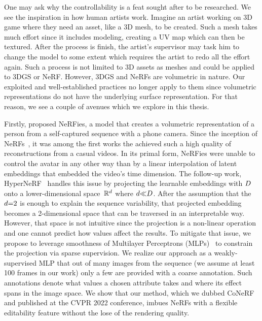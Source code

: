   One may ask why the controllability is a feat sought after to be researched.
  We see the inspiration in how human artists work.
  Imagine an artist working on 3D game where they need an asset, like a 3D mesh,
  to be created.
  Such a mesh takes much effort since it includes modeling, creating a UV map
  which can then be textured.
  After the process is finish, the artist's supervisor may task him to change
  the model to some extent which requires the artist to redo all the effort
  again.
  Such a process is not limited to 3D assets as meshes and could be applied to
  3DGS or NeRF.
  However, 3DGS and NeRFs are volumetric in nature.
  Our exploited and well-established practices no longer apply to them since
  volumetric representations do not have the underlying surface representation.
  For that reason, we see a couple of avenues which we explore in this thesis.

  Firstly, \textcite{park2021nerfies} proposed NeRFies, a model that creates a
  volumetric representation of a person from a self-captured sequence with a
  phone camera.
  Since the inception of NeRFs~\cite{mildenhall2020nerf}, it was among the first
  works the achieved such a high quality of reconstructions from a casual
  videos.
  In its primal form, NeRFies were unable to control the avatar in any other way
  than by a linear interpolation of latent embeddings that embedded the video's
  time dimension.
  The follow-up work, HyperNeRF~\cite{park2021hypernerf} handles this issue by
  projecting the learnable embeddings with $D$ onto a
  lower-dimensional space~$\mathbb{R}^d$ where $d
    {\ll}D$.
  After the assumption that the $d{=}2$ is enough to explain
  the sequence variability, that projected embedding becomes a 2-dimensional
  space that can be traversed in an interpretable way.
  However, that space is not intuitive since the projection is a non-linear
  operation and one cannot predict how values affect the results.
  To mitigate that issue, we propose to leverage smoothness of Multilayer
  Perceptrons (MLPs)~\cite{tancik2020fourier,park2021nerfies} to constrain the
  projection via sparse supervision.
  We realize our approach as a weakly-supervised MLP that out of many images
  from the sequence (we assume at least 100 frames in our work) only a few are
  provided with a coarse annotation.
  Such annotations denote what values a chosen attribute takes and where its
  effect spans in the image space.
  We show that our method, which we dubbed CoNeRF~\cite{kania2022conerf} and
  published at the CVPR 2022 conference, imbues NeRFs with a flexible
  editability feature without the lose of the rendering quality.

